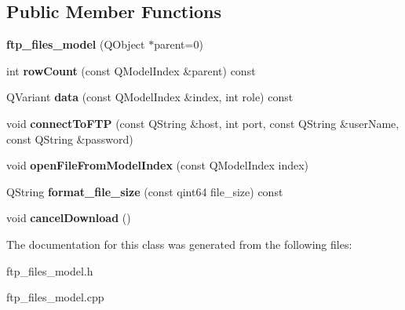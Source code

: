 \subsection*{Public Member Functions}
\begin{DoxyCompactItemize}
\item 
\hypertarget{class_log__viewer_1_1ftp__files__model_a43ae08c73a9a00f51be2977c5656be77}{{\bfseries ftp\-\_\-files\-\_\-model} (Q\-Object $\ast$parent=0)}\label{class_log__viewer_1_1ftp__files__model_a43ae08c73a9a00f51be2977c5656be77}

\item 
\hypertarget{class_log__viewer_1_1ftp__files__model_a92d708869e13ae95be2ff006b40637ec}{int {\bfseries row\-Count} (const Q\-Model\-Index \&parent) const }\label{class_log__viewer_1_1ftp__files__model_a92d708869e13ae95be2ff006b40637ec}

\item 
\hypertarget{class_log__viewer_1_1ftp__files__model_a2b35513db657189098c24c1aa3d79c96}{Q\-Variant {\bfseries data} (const Q\-Model\-Index \&index, int role) const }\label{class_log__viewer_1_1ftp__files__model_a2b35513db657189098c24c1aa3d79c96}

\item 
\hypertarget{class_log__viewer_1_1ftp__files__model_aae85aeaf7540ce6c5538fd1d5728c312}{void {\bfseries connect\-To\-F\-T\-P} (const Q\-String \&host, int port, const Q\-String \&user\-Name, const Q\-String \&password)}\label{class_log__viewer_1_1ftp__files__model_aae85aeaf7540ce6c5538fd1d5728c312}

\item 
\hypertarget{class_log__viewer_1_1ftp__files__model_ae7bf3e3d84d7cafdfb321004cc2735e9}{void {\bfseries open\-File\-From\-Model\-Index} (const Q\-Model\-Index index)}\label{class_log__viewer_1_1ftp__files__model_ae7bf3e3d84d7cafdfb321004cc2735e9}

\item 
\hypertarget{class_log__viewer_1_1ftp__files__model_a6c9fd3a9e4b9eabefa67718efe838dac}{Q\-String {\bfseries format\-\_\-file\-\_\-size} (const qint64 file\-\_\-size) const }\label{class_log__viewer_1_1ftp__files__model_a6c9fd3a9e4b9eabefa67718efe838dac}

\item 
\hypertarget{class_log__viewer_1_1ftp__files__model_a2112976ac1326f47c70d3e2c88e5e158}{void {\bfseries cancel\-Download} ()}\label{class_log__viewer_1_1ftp__files__model_a2112976ac1326f47c70d3e2c88e5e158}

\end{DoxyCompactItemize}


The documentation for this class was generated from the following files\-:\begin{DoxyCompactItemize}
\item 
ftp\-\_\-files\-\_\-model.\-h\item 
ftp\-\_\-files\-\_\-model.\-cpp\end{DoxyCompactItemize}
